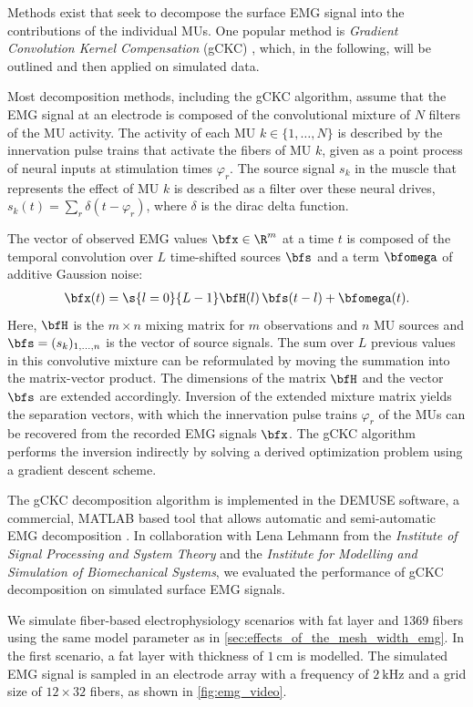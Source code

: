 Methods exist that seek to decompose the surface EMG signal into the contributions of the individual MUs. One popular method is \emph{Gradient Convolution Kernel Compensation} (gCKC) \cite{Holobar2007b,Holobar2007}, which, in the following, will be outlined and then applied on simulated data.

Most decomposition methods, including the gCKC algorithm, assume that the EMG signal at an electrode is composed of the convolutional mixture of $N$ filters of the MU activity. 
The activity of each MU $k\in \{1,\dots,N\}$ is described by the innervation pulse trains that activate the fibers of MU $k$, given as a point process of neural inputs at stimulation times $\varphi_r$. The source signal $s_k$ in the muscle that represents the effect of MU $k$ is described as a filter over these neural drives, $s_k(t) = \sum_r\delta(t - \varphi_r)$, where $\delta$ is the dirac delta function.

The vector of observed EMG values $\bfx \in \R^m$ at a time $t$ is composed of the temporal convolution over $L$ time-shifted sources $\bfs$ and a term $\bfomega$ of additive Gaussion noise:
\begin{align*}
  \bfx(t) = \s{l=0}{L-1}\bfH(l)\,\bfs(t-l) + \bfomega(t).
\end{align*}
Here, $\bfH$ is the $m\times n$ mixing matrix for $m$ observations and $n$ MU sources and $\bfs = (s_k)_{1,\dots,n}$ is the vector of source signals. The sum over $L$ previous values in this convolutive mixture can be reformulated by moving the summation into the matrix-vector product. The dimensions of the matrix $\bfH$ and the vector $\bfs$ are extended accordingly. Inversion of the extended mixture matrix yields the separation vectors, with which the innervation pulse trains $\varphi_r$ of the MUs can be recovered from the recorded EMG signals $\bfx$. The gCKC algorithm performs the inversion indirectly by solving a derived optimization problem using a gradient descent scheme.

The gCKC decomposition algorithm is implemented in the DEMUSE software, a commercial, MATLAB based tool that allows automatic and semi-automatic EMG decomposition \cite{demuse}. In collaboration with Lena Lehmann from the \emph{Institute of Signal Processing and System Theory} and the \emph{Institute for Modelling and Simulation of Biomechanical Systems}, we evaluated the performance of gCKC decomposition on simulated surface EMG signals.

We simulate fiber-based electrophysiology scenarios with fat layer and 1369 fibers using the same model parameter as in \cref{sec:effects_of_the_mesh_width_emg}. In the first scenario, a fat layer with thickness of $\SI{1}{\cm}$ is modelled. The simulated EMG signal is sampled in an electrode array with a frequency of $\SI{2}{\kilo\hertz}$ and a grid size of $12 \times 32$ fibers, as shown in \cref{fig:emg_video}.

